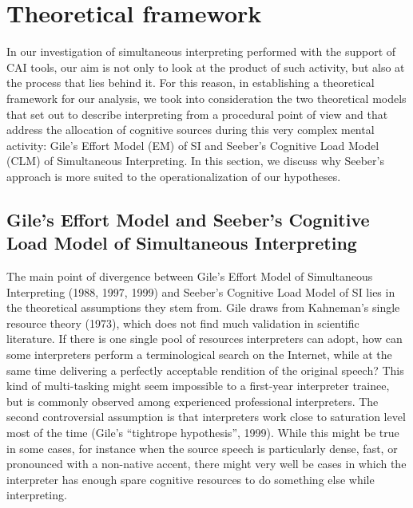 \documentclass[output=paper]{langsci/langscibook}
\begin{document}
\section{Theoretical framework}
In our investigation of simultaneous interpreting performed with the support of CAI tools, our aim is not only to look at the product of such activity, but also at the process that lies behind it. For this reason, in establishing a theoretical framework for our analysis, we took into consideration the two theoretical models that set out to describe interpreting from a procedural point of view and that address the allocation of cognitive sources during this very complex mental activity: Gile’s Effort Model (EM) of SI and Seeber’s Cognitive Load Model (CLM) of Simultaneous Interpreting. In this section, we discuss why Seeber’s approach is more suited to the operationalization of our hypotheses.

\subsection{Gile’s Effort Model and Seeber’s Cognitive Load Model of Simultaneous Interpreting}
The main point of divergence between Gile’s Effort Model of Simultaneous Interpreting (1988, 1997, 1999) and Seeber’s Cognitive Load Model of SI lies in the theoretical assumptions they stem from. Gile draws from Kahneman’s single resource theory (1973), which does not find much validation in scientific literature. If there is one single pool of resources interpreters can adopt, how can some interpreters perform a terminological search on the Internet, while at the same time delivering a perfectly acceptable rendition of the original speech? This kind of multi-tasking might seem impossible to a first-year interpreter trainee, but is commonly observed among experienced professional interpreters. The second controversial assumption is that interpreters work close to saturation level most of the time (Gile’s “tightrope hypothesis”, 1999). While this might be true in some cases, for instance when the source speech is particularly dense, fast, or pronounced with a non-native accent, there might very well be cases in which the interpreter has enough spare cognitive resources to do something else while interpreting. 
\end{document}
